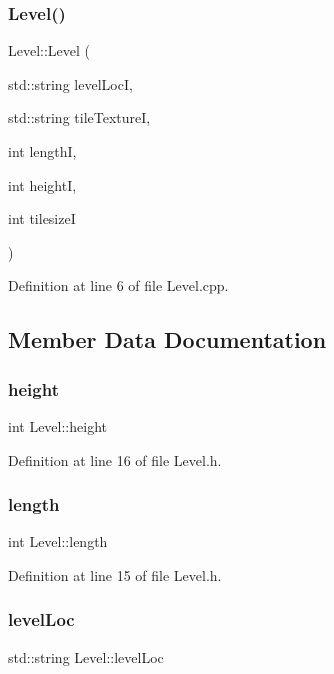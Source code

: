 \subsubsection{\texorpdfstring{Level()}{Level()}}
{\footnotesize\ttfamily Level\+::\+Level (\begin{DoxyParamCaption}\item[{std\+::string}]{level\+LocI,  }\item[{std\+::string}]{tile\+TextureI,  }\item[{int}]{lengthI,  }\item[{int}]{heightI,  }\item[{int}]{tilesizeI }\end{DoxyParamCaption})}



Definition at line 6 of file Level.\+cpp.



\subsection{Member Data Documentation}
\hypertarget{class_level_a16d1b735f7d513cf18bfff1ad4022f58}{}\label{class_level_a16d1b735f7d513cf18bfff1ad4022f58} 
\subsubsection{\texorpdfstring{height}{height}}
{\footnotesize\ttfamily int Level\+::height}



Definition at line 16 of file Level.\+h.

\hypertarget{class_level_a9c1275cd0839ae9af6438b1fbd7780d1}{}\label{class_level_a9c1275cd0839ae9af6438b1fbd7780d1} 
\subsubsection{\texorpdfstring{length}{length}}
{\footnotesize\ttfamily int Level\+::length}



Definition at line 15 of file Level.\+h.

\hypertarget{class_level_a141ea386a839536056884a8965a7d0b8}{}\label{class_level_a141ea386a839536056884a8965a7d0b8} 
\subsubsection{\texorpdfstring{level\+Loc}{levelLoc}}
{\footnotesize\ttfamily std\+::string Level\+::level\+Loc}



